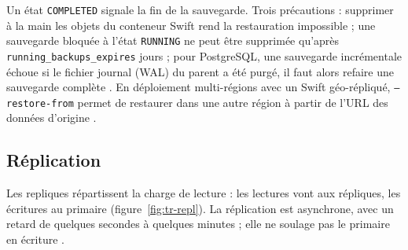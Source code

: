 Un état \texttt{COMPLETED} signale la fin de la sauvegarde. Trois précautions : supprimer à la main les objets du conteneur Swift rend la
restauration impossible ; une sauvegarde bloquée à l'état \texttt{RUNNING} ne peut être supprimée qu'après
\texttt{running\_\allowbreak backups\_\allowbreak expires} jours ; pour PostgreSQL, une sauvegarde incrémentale échoue si le fichier journal (WAL) du
parent a été purgé, il faut alors refaire une sauvegarde complète \parencite{trove-backup}. En déploiement multi-régions avec un Swift
géo-répliqué, \texttt{--restore-from} permet de restaurer dans une autre région à partir de l'URL des données d'origine
\parencite{trove-backup}.

\subsection{Réplication}\label{sec:tr-replication}

Les \glspl{replique} répartissent la charge de lecture : les lectures vont aux répliques, les écritures au primaire (figure~\ref{fig:tr-repl}). La
réplication est asynchrone, avec un retard de quelques secondes à quelques minutes ; elle ne soulage pas le primaire en écriture
\parencite{trove-replication}.

